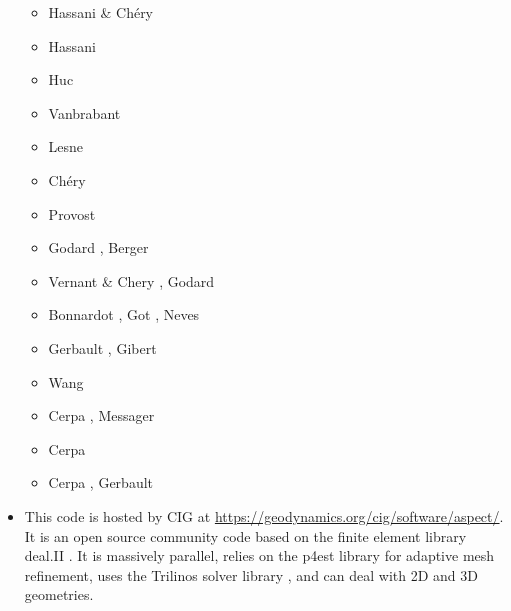\begin{itemize}
\begin{scriptsize}
\begin{itemize}
\item[\nineteenninetysix] Hassani \& Ch\'ery \cite{hach96b}
\item[\nineteenninetyseven] Hassani \etal\cite{hajc97}
\item[\nineteenninetyeight] Huc \etal \cite{huhc98}
\item[\nineteenninetynine] Vanbrabant \etal \cite{vajh99}
\item[\twothousand] Lesne \etal \cite{lecd00}
\item[\twothousandone] Ch\'ery \etal \cite{chzh01}
\item[\twothousandthree] Provost \etal \cite{prch03}
\item[\twothousandfour] Godard \etal \cite{gocl04}, Berger \etal \cite{bejh04}
\item[\twothousandsix] Vernant \& Chery \cite{vech06}, Godard \etal \cite{golc06}
\item[\twothousandeight] Bonnardot \etal \cite{boht08a,boht08b}, Got \etal \cite{gomm08},
                         Neves \etal \cite{netv08}
\item[\twothousandtwelve] Gerbault \etal \cite{gech12}, Gibert \etal \cite{gigh12}
\item[\twothousandthirteen] Wang \etal \cite{wahd13}
\item[\twothousandfourteen] Cerpa \etal \cite{cehg14}, Messager \etal \cite{mehn14}
\item[\twothousandfifteen] Cerpa \etal \cite{ceag15}
\item[\twothousandeighteen] Cerpa \etal \cite{cegm18}, Gerbault \etal \cite{gehn18}
\end{itemize}
\end{scriptsize}

\item \aspect {}

This code is hosted by CIG at \url{https://geodynamics.org/cig/software/aspect/}. 
It is an open source community code based on the finite element library deal.II \cite{bahk07,arbc19,arbd20}. 
It is massively parallel, relies on the p4est library for adaptive mesh refinement,
uses the Trilinos solver library \cite{hewi12}, and can deal with 2D and 3D geometries. 


\end{itemize}
